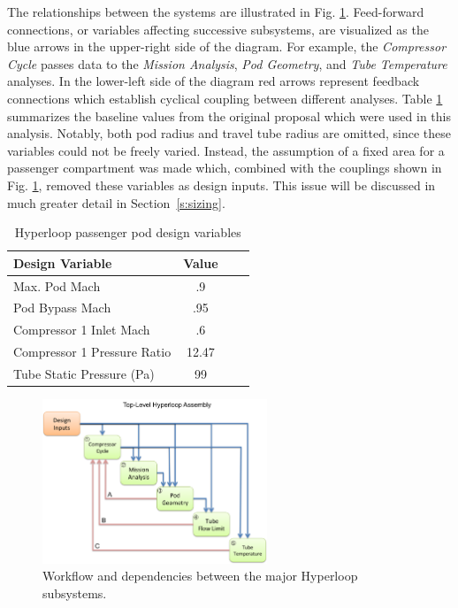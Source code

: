 \documentclass[heading.tex]{subfiles}
\begin{document}
The relationships between the systems are illustrated in Fig. \ref{f:hyperloopXDSM}. 
Feed-forward connections, or variables affecting successive subsystems,
are visualized as the blue arrows in the upper-right side of the diagram.
For example, the \textit{Compressor Cycle} passes data to the \textit{Mission Analysis},
\textit{Pod Geometry}, and \textit{Tube Temperature} analyses.
In the lower-left side of the diagram red arrows represent feedback connections which establish cyclical coupling between different analyses.
Table \ref{tab:desvars} summarizes the baseline values from the original proposal which were used in this analysis.
Notably, both pod radius and travel tube radius are omitted, since these variables could not be freely varied.
Instead, the assumption of a fixed area for a passenger compartment was made which,
combined with the couplings shown in Fig. \ref{f:hyperloopXDSM}, removed these variables as design inputs.
This issue will be discussed in much greater detail in Section~\ref{s:sizing}.

\begin{table}
    \centering
    \caption{Hyperloop passenger pod design variables}
    \label{tab:desvars}
    \begin{tabular}{l  c  c  c} 
        \hline
        Design Variable &  Value\\ \hline 
        Max. Pod Mach & .9 \\ 
        Pod Bypass Mach & .95\\
        Compressor 1 Inlet Mach & .6\\ 
        Compressor 1 Pressure Ratio & 12.47\\ 
        Tube Static Pressure (Pa) & 99 \\ \hline
    \end{tabular}
\end{table}

\begin{figure}[hbtp]
\centering
\includegraphics[width=0.6\textwidth]{images/TopAssembly.png}
\caption{Workflow and dependencies between the major Hyperloop subsystems.}
\label{f:hyperloopXDSM}
\end{figure}
\end{document}
